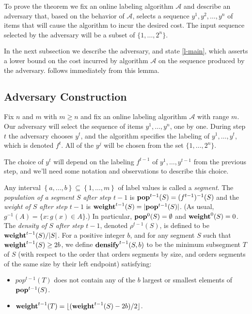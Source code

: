 \documentclass[unicode,review]{siamart1116}
\newcommand{\A}{\mathcal{A}}
\newcommand{\natInt}[2]{ \left\{ #1, \dotsc, #2 \right\} }
\newcommand{\pop}{{\rm {\bf pop}}}
\newcommand{\weight}{{\rm {\bf weight}}}
\newcommand{\densify}{{\rm {\bf densify}}}
\numberwithin{theorem}{section}
\providecommand{\DIFadd}[1]{{\protect\color{blue}\uwave{#1}}} %
\providecommand{\DIFdel}[1]{{\protect\color{red}\sout{#1}}}                      %
\providecommand{\DIFaddbegin}{} %
\providecommand{\DIFaddend}{} %
\providecommand{\DIFdelbegin}{} %
\providecommand{\DIFdelend}{} %
\newcommand{\DIFscaledelfig}{0.5}
\newlength{\DIFdelgraphicswidth} %
\newlength{\DIFdelgraphicsheight} %
\newcommand{\DIFaddincludegraphics}[2][]{{\color{blue}\fbox{\DIFOincludegraphics[#1]{#2}}}} %
\newcommand{\DIFdelincludegraphics}[2][]{%
\sbox{\DIFdelgraphicsbox}{\DIFOincludegraphics[#1]{#2}}%
\settoboxwidth{\DIFdelgraphicswidth}{\DIFdelgraphicsbox} %
\settoboxtotalheight{\DIFdelgraphicsheight}{\DIFdelgraphicsbox} %
\scalebox{\DIFscaledelfig}{%
\parbox[b]{\DIFdelgraphicswidth}{\usebox{\DIFdelgraphicsbox}\\[-\baselineskip] \rule{\DIFdelgraphicswidth}{0em}}\llap{\resizebox{\DIFdelgraphicswidth}{\DIFdelgraphicsheight}{%
\setlength{\unitlength}{\DIFdelgraphicswidth}%
\begin{picture}(1,1)%
\thicklines\linethickness{2pt} %
{\color[rgb]{1,0,0}\put(0,0){\framebox(1,1){}}}%
{\color[rgb]{1,0,0}\put(0,0){\line( 1,1){1}}}%
{\color[rgb]{1,0,0}\put(0,1){\line(1,-1){1}}}%
\end{picture}%
}\hspace*{3pt}}} %
} %
\DeclareRobustCommand{\DIFaddbegin}{\DIFOaddbegin \let\includegraphics\DIFaddincludegraphics} %
\DeclareRobustCommand{\DIFaddend}{\DIFOaddend \let\includegraphics\DIFOincludegraphics} %
\DeclareRobustCommand{\DIFdelbegin}{\DIFOdelbegin \let\includegraphics\DIFdelincludegraphics} %
\DeclareRobustCommand{\DIFdelend}{\DIFOaddend \let\includegraphics\DIFOincludegraphics} %
\begin{document}
To prove the theorem we fix an online labeling algorithm $\A$ and describe an adversary that, based on the 
behavior of $\A$, selects a sequence $y^1,y^2,\dotsc,y^n$ of items that will cause
the algorithm to incur the desired cost.  The input sequence selected by the adversary will be a subset of
$\{1,\ldots,2^n\}$.

 In the next subsection we  describe the adversary,
and state \cref{l-main}, which asserts a lower bound on the cost incurred
by algorithm $\A$ on  the sequence produced by the adversary.  follows
immediately from this lemma.

\subsection{Adversary Construction}
\label{ss-adversary}

Fix $n$ and $m$ with $m\ge n$  and 
fix an online labeling algorithm $\A$ with range $m$.  Our adversary will select 
the sequence of items $y^1,\dotsc,y^n$, one by one.    During step $t$  the adversary chooses $y^t$,
and the algorithm specifies the labeling of $y^1,\ldots,y^t$, which is denoted $f^t$.  All of the $y^j$ will be chosen
from the set $\{1,\ldots,2^{n}\}$.

The choice of $y^t$ will depend on
the labeling $f^{t-1}$ of $y^1,\ldots,y^{t-1}$ from the previous step, and we'll need some notation and
observations to describe this choice.   

Any interval $\natInt{a}{b} \subseteq \natInt{1}{m}$ of label values is called a \emph{segment}.
The \emph{population of a segment $S$ after step $t-1$} is $\pop^{t-1}(S) = (f^{t-1})^{-1}(S)$ and the
\emph{weight of $S$ after step $t-1$} is $\weight^{t-1}(S) = |\pop^{t-1}(S)|$. (As usual, $g^{-1}(A) = \{ x : g(x) \in A \}$.)
In particular,  $\pop^0(S) = \emptyset$ and $\weight^0(S) = 0$.
The \emph{density of $S$ after step $t-1$}, denoted $\rho^{t-1}(S)$, is defined to be $\weight^{t-1}(S) / |S|$. For a positive
integer $b$, and for any segment $S$ such that $\weight^{t-1}(S) \geq 2b$, we define
$\densify^{t-1}(S,b)$ to be the minimum  subsegment $T$ of $S$ (with respect to the order that
orders segments by size, and orders segments of the same size by their left endpoint) satisfying:

\begin{itemize}
\item \DIFdelbegin \DIFdel{$pop^{t-1}(T)$ }\DIFdelend \DIFaddbegin \DIFadd{$\pop^{t-1}(T)$ }\DIFaddend does not contain any of the  $b$ largest or smallest elements of $\pop^{t-1}(S)$.
\item  $\weight^{t-1}(T)=\lfloor (\weight^{t-1}(S)-2b)/2 \rfloor$.
\end{itemize} 
\end{document}
